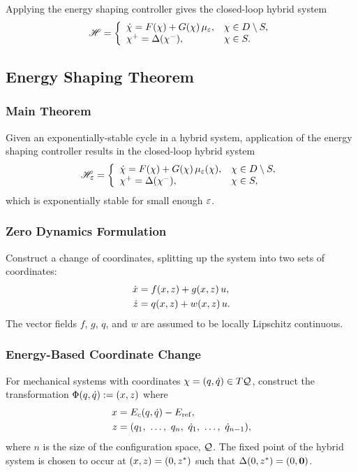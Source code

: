 \begin{frame}
  Applying the energy shaping controller gives the closed-loop hybrid system
  \begin{align*}
    \mathscr{H} = \left\{
      \begin{array}{l l}
        {\dot {\chi}} = F(\chi) + G(\chi) \, \mu_{\varepsilon}, & \chi \in D \setminus S,\\
        \chi^{+} = \Delta(\chi^{-}), & \chi \in S.
      \end{array}\right.
  \end{align*}
  
\end{frame}

\subsection{Energy Shaping Theorem}

\begin{frame}
  \frametitle{Main Theorem}

  \begin{theorem}
    Given an exponentially-stable cycle in a hybrid system, application
    of the energy shaping controller results in the closed-loop hybrid system
    \begin{align*}
      \mathscr{H}_{\varepsilon} = \left\{
      \begin{array}{l l}
        {\dot {\chi}} = F(\chi) + G(\chi) \, \mu_{\varepsilon}(\chi), & \chi \in D \setminus S,\\
        \chi^{+} = \Delta(\chi^{-}), & \chi \in S,
      \end{array}\right.
  \end{align*}
  which is exponentially stable for small enough $\varepsilon$.
  
  \end{theorem}
\end{frame}

\begin{frame}
  \frametitle{Zero Dynamics Formulation}
  Construct a change of coordinates, splitting up the system into two sets of coordinates:
  \begin{align*}
    \dot {x} &= f(x, z) + g(x, z) \, u,\\
    \dot {z} &= q(x, z) + w(x, z) \, u.
  \end{align*}
  The vector fields $f$, $g$, $q$, and $w$ are assumed to be locally Lipschitz continuous.
\end{frame}

\begin{frame}
  \frametitle{Energy-Based Coordinate Change}
  For mechanical systems with coordinates $\chi = (q, \dot q) \in T\mathcal{Q}$, construct the transformation $\Phi(q, \dot q) := (x, z)$ where
  \begin{align*}
    x &= E_{c}(q, \dot q) - E_{\mathrm{ref}},\\
    z &= (q_{1}, \ \ldots, \ q_{n}, \ \dot q_{1}, \ \ldots, \ \dot q_{n-1}),
  \end{align*}
  where $n$ is the size of the configuration space, $\mathcal{Q}$. The fixed point of the
  hybrid system is chosen to occur at $(x, z) = (0, z^{*})$ such that $\Delta(0, z^{*}) =
  (0, {\mathbf 0})$.
\end{frame}


